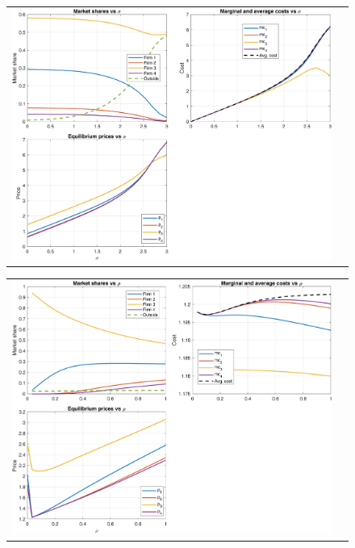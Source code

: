 \documentclass[12pt]{article}
\theoremstyle{plain}
\theoremstyle{plain}
\begin{document}
\begin{figure}[H]
\caption{}
 \label{fig:sigma}
\centering{}%
\begin{tabular}{cc}
\includegraphics[scale=.7]{figures/simulations/sigma_panels_4firms.png} 
\end{tabular}
\end{figure}


 

 \begin{figure}[H]
\caption{}
 \label{fig:sigma}
\centering{}%
\begin{tabular}{cc}
\includegraphics[scale=.7]{figures/simulations/rho_panels_4firms.png} 
\end{tabular}
\end{figure}
 
\end{document}
